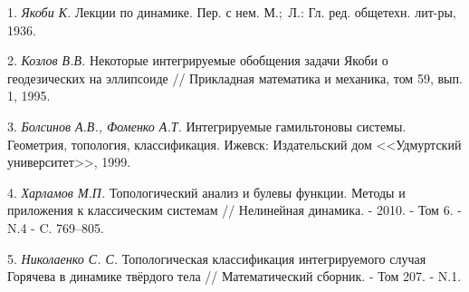 \litlist

1.  {\it Якоби К.} Лекции по динамике. Пер. с нем. М.;~Л.: Гл. ред. общетехн. лит-ры, 1936.

2.  {\it Козлов В.В.} Некоторые интегрируемые обобщения задачи Якоби о геодезических на эллипсоиде // Прикладная математика и механика, том 59, вып. 1, 1995.

3.  {\it Болсинов А.В., Фоменко А.Т.} Интегрируемые гамильтоновы системы. Геометрия, топология, классификация. Ижевск: Издательский дом <<Удмуртский университет>>, 1999.

4. {\it Харламов М.П.} Топологический анализ и булевы функции. Методы и приложения к классическим системам // Нелинейная динамика. - 2010. - Том 6. - N.4 - C. 769--805.

5. {\it Николаенко С. С.} Топологическая классификация интегрируемого случая Горячева в динамике твёрдого тела // Математический сборник. - Том 207. - N.1.

